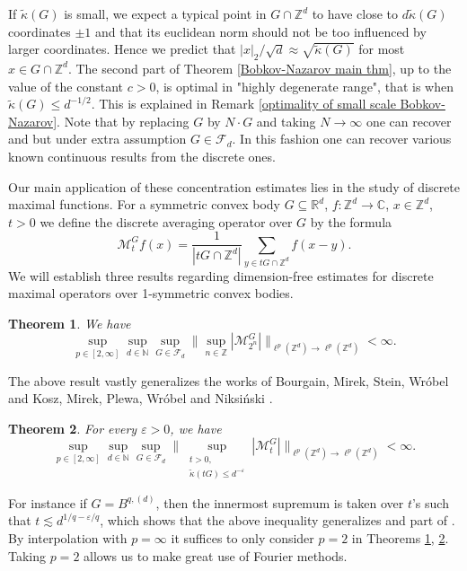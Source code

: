 \documentclass[10pt,a4paper]{amsart}
\numberwithin{equation}{section}
\newtheorem{Thm}{Theorem}[section]
\newcommand{\Z}{\mathbb{Z}}
\newcommand{\R}{\mathbb{R}}
\newcommand{\C}{\mathbb{C}}
\newcommand{\N}{\mathbb{N}}
\begin{document}
If $\widetilde{\kappa}(G)$ is small, we expect a typical point in $G \cap \Z^d$ to have close to $d \widetilde{\kappa}(G)$ coordinates $\pm 1$ and that its euclidean norm should not be too influenced by larger coordinates. Hence we predict that $|x|_2/ \sqrt{d} \approx \sqrt{\widetilde{\kappa}(G) }$ for most $x \in G \cap \Z^d$. The second part of Theorem \ref{Bobkov-Nazarov main thm}, up to the value of the constant $c>0$, is optimal in "highly degenerate range", that is when $\widetilde{\kappa}(G) \le d^{-1/2}$. This is explained in Remark \ref{optimality of small scale Bobkov-Nazarov}.
Note that by replacing $G$ by $N\cdot G$ and taking $N \to \infty$ one can recover \cite[Theorem 1.2]{bob-naz} and \cite[Theorem 1.1]{Pa} but under extra assumption $G \in \mathcal{F}_d$. In this fashion one can recover various known continuous results from the discrete ones. 
\par Our main application of these concentration estimates lies in the study of discrete maximal functions.
For a symmetric convex body $G \subseteq \R^d$, $f: \Z^d \to \C$, $x \in \Z^d$, $t>0$ we define the discrete averaging operator over $G$ by the formula
\[
\mathcal{M}_t^G f(x)= \frac{1}{|tG \cap \Z^d|} \sum_{y \in tG \cap \Z^d} f(x-y).
\]
We will establish three results regarding dimension-free estimates for discrete maximal operators over 1-symmetric convex bodies.
\begin{Thm} \label{dyadic dim-free}
 We have 
 \[
 \sup_{p \in [2,\infty]} \sup_{d \in \N} \sup_{G \in \mathcal{F}_d} \Big\| \sup_{n \in \Z} |\mathcal{M}_{2^n}^G| \Big\|_{\ell^p(\Z^d) \to \ell^p(\Z^d)}< \infty.
 \]
\end{Thm}
The above result vastly generalizes the works of Bourgain, Mirek, Stein, Wróbel \cite{balls} and Kosz, Mirek, Plewa, Wróbel \cite[Theorem 3]{KMPW} and Niksiński \cite{Ni2}.
\begin{Thm} \label{small scale dim-free}
 For every $\varepsilon>0$, we have 
 \[
 \sup_{p \in [2,\infty]} \sup_{d \in \N} \sup_{G \in \mathcal{F}_d} \Big\| \sup_{\substack{t>0, \\
 \widetilde{\kappa}(tG) \le d^{-\varepsilon}}} |\mathcal{M}_{t}^G| \Big\|_{\ell^p(\Z^d) \to \ell^p(\Z^d)}< \infty.
 \]
\end{Thm} 
For instance if $G=B^{q,(d)}$, then the innermost supremum is taken over $t$'s such that $t \lesssim d^{1/q-\varepsilon/q}$, which shows that the above inequality generalizes \cite[Theorem 1.1]{NW} and part of \cite[Theorem 1.15]{KNW}.
By interpolation with $p=\infty$ it suffices to only consider $p=2$ in Theorems \ref{dyadic dim-free}, \ref{small scale dim-free}. Taking $p=2$ allows us to make great use of Fourier methods.
\end{document}
